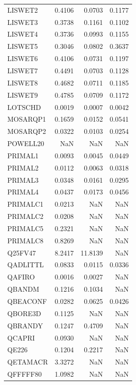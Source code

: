 \begin{longtable}{lrrr}
LISWET2  &   0.4106 &    0.0703 &  0.1177 \\
LISWET3  &   0.3738 &    0.1161 &  0.1102 \\
LISWET4  &   0.3736 &    0.0993 &  0.1155 \\
LISWET5  &   0.3046 &    0.0802 &  0.3637 \\
LISWET6  &   0.4106 &    0.0731 &  0.1197 \\
LISWET7  &   0.4491 &    0.0703 &  0.1128 \\
LISWET8  &   0.4682 &    0.0711 &  0.1185 \\
LISWET9  &   0.4785 &    0.0709 &  0.1172 \\
LOTSCHD  &   0.0019 &    0.0007 &  0.0042 \\
MOSARQP1 &   0.1659 &    0.0152 &  0.0541 \\
MOSARQP2 &   0.0322 &    0.0103 &  0.0254 \\
POWELL20 &      NaN &       NaN &     NaN \\
PRIMAL1  &   0.0093 &    0.0045 &  0.0449 \\
PRIMAL2  &   0.0112 &    0.0063 &  0.0318 \\
PRIMAL3  &   0.0348 &    0.0161 &  0.0295 \\
PRIMAL4  &   0.0437 &    0.0173 &  0.0456 \\
PRIMALC1 &   0.0213 &       NaN &     NaN \\
PRIMALC2 &   0.0208 &       NaN &     NaN \\
PRIMALC5 &   0.2321 &       NaN &     NaN \\
PRIMALC8 &   0.8269 &       NaN &     NaN \\
Q25FV47  &   8.2417 &   11.8139 &     NaN \\
QADLITTL &   0.0833 &    0.0115 &  0.0336 \\
QAFIRO   &   0.0016 &    0.0027 &     NaN \\
QBANDM   &   0.1216 &    0.1034 &     NaN \\
QBEACONF &   0.0282 &    0.0625 &  0.0426 \\
QBORE3D  &   0.1125 &       NaN &     NaN \\
QBRANDY  &   0.1247 &    0.4709 &     NaN \\
QCAPRI   &   0.0930 &       NaN &     NaN \\
QE226    &   0.1204 &    0.2217 &     NaN \\
QETAMACR &   3.3272 &       NaN &     NaN \\
QFFFFF80 &   1.0982 &       NaN &     NaN \\

\end{longtable}
